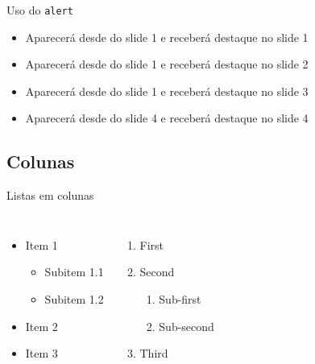 \documentclass{beamer}
\begin{document}
\begin{frame}{Uso do \texttt{alert}}
    \begin{itemize}
        \item<1-| alert@1> Aparecerá desde do slide 1 e receberá destaque no slide 1
        \item<1-| alert@2> Aparecerá desde do slide 1 e receberá destaque no slide 2
        \item<1-| alert@3> Aparecerá desde do slide 1 e receberá destaque no slide 3
        \item<4-| alert@4> Aparecerá desde do slide 4 e receberá destaque no slide 4
    \end{itemize} 
\end{frame}

\subsection{Colunas}

\begin{frame}{Listas em colunas}
    \begin{columns}[t, onlytextwidth]
            \begin{itemize}
                \item Item 1
                \begin{itemize}
                    \item Subitem 1.1
                    \item Subitem 1.2
                \end{itemize}
                \item Item 2
                \item Item 3
            \end{itemize}
        
            \begin{enumerate}
                \item First
                \item Second
                \begin{enumerate}
                    \item Sub-first
                    \item Sub-second
                \end{enumerate}
                \item Third
            \end{enumerate}
    \end{columns}
\end{frame}
\end{document}
